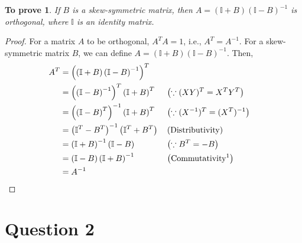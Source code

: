 \documentclass[11pt, oneside]{article}
\newtheorem*{remark}{To prove}
\begin{document}
\begin{remark}
If $B$ is a skew-symmetric matrix, then $A = (\mathbb{I}+B)(\mathbb{I}-B)^{-1}$ is orthogonal, where $\mathbb{I}$ is an identity matrix.
\end{remark}
\begin{proof}
  For a matrix $A$ to be orthogonal, $A^T A = 1$, i.e., $A^T = A^{-1}$. For a skew-symmetric matrix $B$, we can define $ A = (\mathbb{I}+B)(\mathbb{I}-B)^{-1}$. Then,
  \begin{align*}
    A^T   &= \left(\left(\mathbb{I}+B\right)\left(\mathbb{I}-B\right)^{-1}\right)^T \\
          &= \left(\left(\mathbb{I}-B\right)^{-1}\right)^T\left(\mathbb{I}+B\right)^T     && \left(\because (XY)^T = X^T Y^T\right)\\
          &= \left(\left(\mathbb{I}-B\right)^T\right)^{-1}\left(\mathbb{I}+B\right)^T     && \left(\because (X^{-1})^T = (X^T)^{-1}\right)\\
          &= \left(\mathbb{I}^T-B^T\right)^{-1}\left(\mathbb{I}^T+B^T\right)              && \left(\text{Distributivity}\right) \\
          &= \left(\mathbb{I} + B\right)^{-1}\left(\mathbb{I}-B\right)                             && \left(\because B^T = - B\right)\\
          &= \left(\mathbb{I}-B\right)\left(\mathbb{I}+B\right)^{-1}                                        && \left(\text{Commutativity\footnotemark}\right)\\
          &= A^{-1}                                                 && \qedhere
  \end{align*}
\end{proof}

\section*{Question 2}
\end{document}
